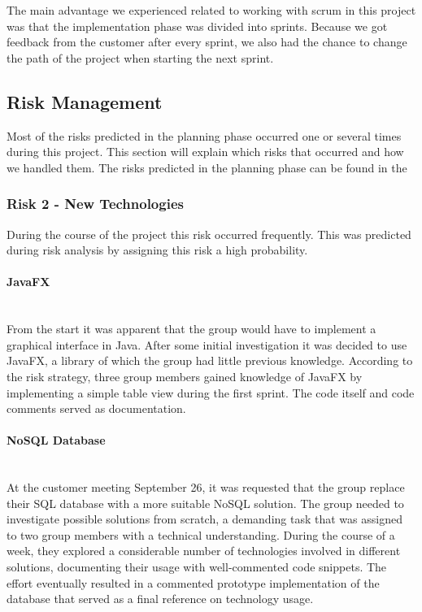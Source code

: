 \documentclass[../document]{subfiles}
\begin{document}
The main advantage we experienced related to working with scrum in this project was that the implementation phase was divided into sprints. Because we got feedback from the customer after every sprint, we also had the chance to change the path of the project when starting the next sprint.  

\subsection{Risk Management}
\label{risk_management}
Most of the risks predicted in the planning phase occurred one or several times during this project. This section will explain which risks that occurred and how we handled them.  The risks predicted in the planning phase can be found in the 

\subsubsection{Risk 2 - New Technologies}
During the course of the project this risk occurred frequently. This was predicted during risk analysis by assigning this risk a high probability. 

\paragraph{\gls{JavaFX}} \ \\
From the start it was apparent that the group would have to implement a graphical interface in \gls{Java}. After some initial investigation it was decided to use \gls{JavaFX}, a library of which the group had little previous knowledge. According to the risk strategy, three group members gained knowledge of \gls{JavaFX} by implementing a simple table view during the first sprint. The code itself and code comments served as documentation. 

\paragraph{NoSQL Database} \ \\
At the customer meeting September 26, it was requested that the group replace their \gls{SQL} database with a more suitable NoSQL solution. The group needed to investigate possible solutions from scratch, a demanding task that was assigned to two group members with a technical understanding. During the course of a week, they explored a considerable number of technologies involved in different solutions, documenting their usage with well-commented code snippets. The effort eventually resulted in a commented prototype implementation of the database that served as a final reference on technology usage.
\end{document}
